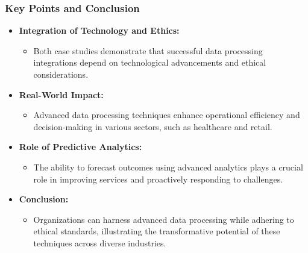 \documentclass[aspectratio=169]{beamer}
\begin{document}
\begin{frame}[fragile]
    \frametitle{Key Points and Conclusion}
    \begin{itemize}
        \item \textbf{Integration of Technology and Ethics:}
            \begin{itemize}
                \item Both case studies demonstrate that successful data processing integrations depend on technological advancements and ethical considerations.
            \end{itemize}
        \item \textbf{Real-World Impact:}
            \begin{itemize}
                \item Advanced data processing techniques enhance operational efficiency and decision-making in various sectors, such as healthcare and retail.
            \end{itemize}
        \item \textbf{Role of Predictive Analytics:}
            \begin{itemize}
                \item The ability to forecast outcomes using advanced analytics plays a crucial role in improving services and proactively responding to challenges.
            \end{itemize}
        \item \textbf{Conclusion:}
            \begin{itemize}
                \item Organizations can harness advanced data processing while adhering to ethical standards, illustrating the transformative potential of these techniques across diverse industries.
            \end{itemize}
    \end{itemize}
\end{frame}
\end{document}
